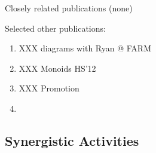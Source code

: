 

\noindent Closely related publications (none)

\noindent
\noindent Selected other publications:
\begin{enumerate}\itemsep 0pt
  \item XXX diagrams with Ryan @ FARM
  \item XXX Monoids HS'12
  \item XXX Promotion
  \item {}
\end{enumerate}

\subsection*{Synergistic Activities}



